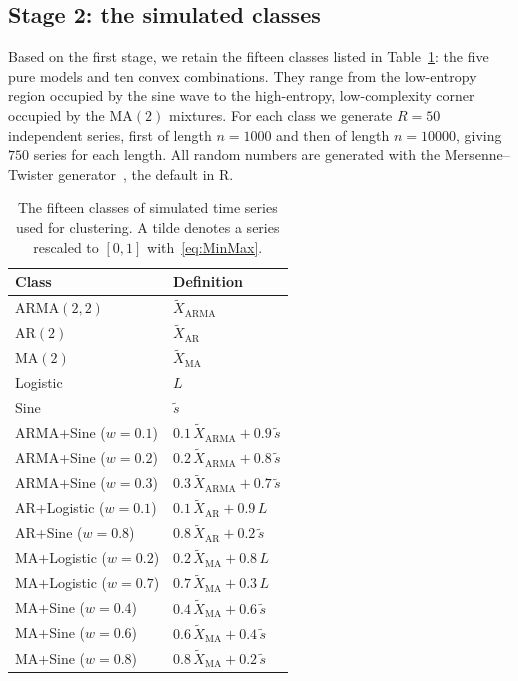 \subsection{Stage 2: the simulated classes}\label{Subsec:SimStage2}

Based on the first stage, we retain the fifteen classes listed in Table~\ref{tab:SimClasses}: the five pure models and ten convex combinations. They range from the low-entropy region occupied by the sine wave to the high-entropy, low-complexity corner occupied by the MA$(2)$ mixtures. For each class we generate $R=50$ independent series, first of length $n=1000$ and then of length $n=10000$, giving $750$ series for each length. All random numbers are generated with the Mersenne--Twister generator~\cite{Matsumoto1998}, the default in R.

\begin{table}[H]
	\centering
	\begin{tabular}{ll}
		\toprule
		Class & Definition \\
		\midrule
		ARMA$(2,2)$ & $\widetilde{X}_{\mathrm{ARMA}}$ \\
		AR$(2)$     & $\widetilde{X}_{\mathrm{AR}}$ \\
		MA$(2)$     & $\widetilde{X}_{\mathrm{MA}}$ \\
		Logistic    & $L$ \\
		Sine        & $\widetilde{s}$ \\
		\midrule
		ARMA+Sine ($w=0.1$) & $0.1\,\widetilde{X}_{\mathrm{ARMA}}+0.9\,\widetilde{s}$ \\
		ARMA+Sine ($w=0.2$) & $0.2\,\widetilde{X}_{\mathrm{ARMA}}+0.8\,\widetilde{s}$ \\
		ARMA+Sine ($w=0.3$) & $0.3\,\widetilde{X}_{\mathrm{ARMA}}+0.7\,\widetilde{s}$ \\
		\midrule
		AR+Logistic ($w=0.1$) & $0.1\,\widetilde{X}_{\mathrm{AR}}+0.9\,L$ \\
		AR+Sine ($w=0.8$)     & $0.8\,\widetilde{X}_{\mathrm{AR}}+0.2\,\widetilde{s}$ \\
		\midrule
		MA+Logistic ($w=0.2$) & $0.2\,\widetilde{X}_{\mathrm{MA}}+0.8\,L$ \\
		MA+Logistic ($w=0.7$) & $0.7\,\widetilde{X}_{\mathrm{MA}}+0.3\,L$ \\
		MA+Sine ($w=0.4$)     & $0.4\,\widetilde{X}_{\mathrm{MA}}+0.6\,\widetilde{s}$ \\
		MA+Sine ($w=0.6$)     & $0.6\,\widetilde{X}_{\mathrm{MA}}+0.4\,\widetilde{s}$ \\
		MA+Sine ($w=0.8$)     & $0.8\,\widetilde{X}_{\mathrm{MA}}+0.2\,\widetilde{s}$ \\
		\bottomrule
	\end{tabular}
	\caption{The fifteen classes of simulated time series used for clustering. A tilde denotes a series rescaled to $[0,1]$ with~\eqref{eq:MinMax}.}
	\label{tab:SimClasses}
\end{table}

